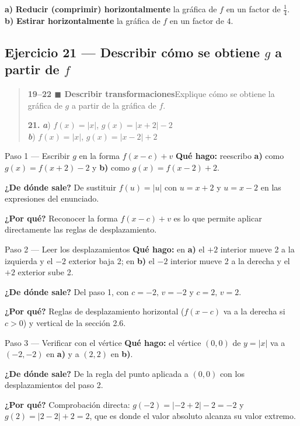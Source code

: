 \documentclass[11pt]{article}
\begin{document}
\begin{resp}
\textbf{a)} \textbf{Reducir (comprimir) horizontalmente} la gráfica de $f$ en un factor de $\tfrac14$.\\
\textbf{b)} \textbf{Estirar horizontalmente} la gráfica de $f$ en un factor de $4$.
\end{resp}

\subsection*{Ejercicio 21 — Describir cómo se obtiene $g$ a partir de $f$}

\begin{quote}
\textbf{19--22 $\blacksquare$ Describir transformaciones}\quad Explique cómo se obtiene la gráfica de $g$ a partir de la gráfica de $f$.

\textbf{21.} \textbf{\textit{a}}) $f(x)=|x|$, \quad $g(x)=|x+2|-2$\\
 \textbf{\textit{b}}) $f(x)=|x|$, \quad $g(x)=|x-2|+2$
\end{quote}

\begin{paso}{Paso 1 --- Escribir $g$ en la forma $f(x-c)+v$}
\textbf{Qué hago:} reescribo \textbf{a)} como $g(x)=f(x+2)-2$ y \textbf{b)} como $g(x)=f(x-2)+2$.

\textbf{¿De dónde sale?} De sustituir $f(u)=|u|$ con $u=x+2$ y $u=x-2$ en las expresiones del enunciado.

\textbf{¿Por qué?} Reconocer la forma $f(x-c)+v$ es lo que permite aplicar directamente las reglas de desplazamiento.
\end{paso}

\begin{paso}{Paso 2 --- Leer los desplazamientos}
\textbf{Qué hago:} en \textbf{a)} el $+2$ interior mueve 2 a la izquierda y el $-2$ exterior baja 2; en \textbf{b)} el $-2$ interior mueve 2 a la derecha y el $+2$ exterior sube 2.

\textbf{¿De dónde sale?} Del paso 1, con $c=-2,\,v=-2$ y $c=2,\,v=2$.

\textbf{¿Por qué?} Reglas de desplazamiento horizontal ($f(x-c)$ va a la derecha si $c>0$) y vertical de la sección 2.6.
\end{paso}

\begin{paso}{Paso 3 --- Verificar con el vértice}
\textbf{Qué hago:} el vértice $(0,0)$ de $y=|x|$ va a $(-2,-2)$ en \textbf{a)} y a $(2,2)$ en \textbf{b)}.

\textbf{¿De dónde sale?} De la regla del punto aplicada a $(0,0)$ con los desplazamientos del paso 2.

\textbf{¿Por qué?} Comprobación directa: $g(-2)=|-2+2|-2=-2$ y $g(2)=|2-2|+2=2$, que es donde el valor absoluto alcanza su valor extremo.
\end{paso}
\end{document}

